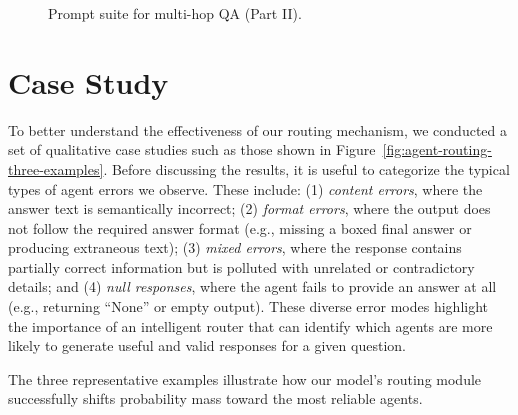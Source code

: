 \documentclass[11pt]{article}
\begin{document}
\begin{figure}[t]
\vspace{-10pt}
\caption{Prompt suite for multi-hop QA (Part II).}
\label{fig:qa-prompts-part2}
\end{figure}

\section{Case Study}


To better understand the effectiveness of our routing mechanism, we conducted a set of qualitative case studies such as those shown in Figure~\ref{fig:agent-routing-three-examples}. Before discussing the results, it is useful to categorize the typical types of agent errors we observe. These include: (1) \emph{content errors}, where the answer text is semantically incorrect; (2) \emph{format errors}, where the output does not follow the required answer format (e.g., missing a boxed final answer or producing extraneous text); (3) \emph{mixed errors}, where the response contains partially correct information but is polluted with unrelated or contradictory details; and (4) \emph{null responses}, where the agent fails to provide an answer at all (e.g., returning ``None'' or empty output). These diverse error modes highlight the importance of an intelligent router that can identify which agents are more likely to generate useful and valid responses for a given question.

The three representative examples illustrate how our model’s routing module successfully shifts probability mass toward the most reliable agents. 
\end{document}
